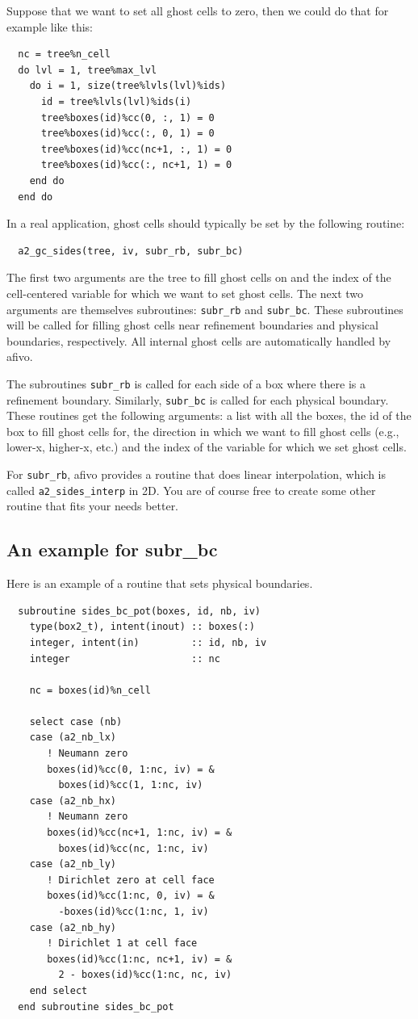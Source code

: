 \documentclass[a4paper, a4wide]{article}
\begin{document}
Suppose that we want to set all ghost cells to zero, then we could do that for
example like this:
\begin{lstlisting}
  nc = tree%n_cell
  do lvl = 1, tree%max_lvl
    do i = 1, size(tree%lvls(lvl)%ids)
      id = tree%lvls(lvl)%ids(i)
      tree%boxes(id)%cc(0, :, 1) = 0
      tree%boxes(id)%cc(:, 0, 1) = 0
      tree%boxes(id)%cc(nc+1, :, 1) = 0
      tree%boxes(id)%cc(:, nc+1, 1) = 0
    end do
  end do
\end{lstlisting}
In a real application, ghost cells should typically be set by the following routine:
\begin{lstlisting}
  a2_gc_sides(tree, iv, subr_rb, subr_bc)
\end{lstlisting}
The first two arguments are the tree to fill ghost cells on and the index of the
cell-centered variable for which we want to set ghost cells.
The next two arguments are themselves subroutines: \texttt{subr\_rb} and
\texttt{subr\_bc}.
These subroutines will be called for filling ghost cells near refinement
boundaries and physical boundaries, respectively.
All internal ghost cells are automatically handled by afivo.

The subroutines \texttt{subr\_rb} is called for each side of a box where there
is a refinement boundary.
Similarly, \texttt{subr\_bc} is called for each physical boundary.
These routines get the following arguments: a list with all the boxes, the id of
the box to fill ghost cells for, the direction in which we want to fill ghost
cells (e.g., lower-x, higher-x, etc.)
and the index of the variable for which we set ghost cells.

For \texttt{subr\_rb}, afivo provides a routine that does linear interpolation,
which is called \texttt{a2\_sides\_interp} in 2D.
You are of course free to create some other routine that fits your needs better.

\subsection{An example for subr\_bc}
\label{sec:ghost-cells-example}

Here is an example of a routine that sets physical boundaries.
\begin{lstlisting}
  subroutine sides_bc_pot(boxes, id, nb, iv)
    type(box2_t), intent(inout) :: boxes(:)
    integer, intent(in)         :: id, nb, iv
    integer                     :: nc

    nc = boxes(id)%n_cell

    select case (nb)
    case (a2_nb_lx)
       ! Neumann zero
       boxes(id)%cc(0, 1:nc, iv) = &
         boxes(id)%cc(1, 1:nc, iv)
    case (a2_nb_hx)
       ! Neumann zero
       boxes(id)%cc(nc+1, 1:nc, iv) = &
         boxes(id)%cc(nc, 1:nc, iv)
    case (a2_nb_ly)
       ! Dirichlet zero at cell face
       boxes(id)%cc(1:nc, 0, iv) = &
         -boxes(id)%cc(1:nc, 1, iv)
    case (a2_nb_hy)
       ! Dirichlet 1 at cell face
       boxes(id)%cc(1:nc, nc+1, iv) = &
         2 - boxes(id)%cc(1:nc, nc, iv)
    end select
  end subroutine sides_bc_pot
\end{lstlisting}
\end{document}
